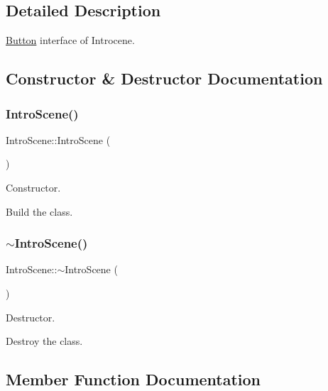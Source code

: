 \subsection{Detailed Description}
\hyperlink{classButton}{Button} interface of Introcene. 

\subsection{Constructor \& Destructor Documentation}
\mbox{\label{classIntroScene_a3691b51409f65b40f0c84008e49ef32b}} 
\subsubsection{\texorpdfstring{Intro\+Scene()}{IntroScene()}}
{\footnotesize\ttfamily Intro\+Scene\+::\+Intro\+Scene (\begin{DoxyParamCaption}{ }\end{DoxyParamCaption})}



Constructor. 

Build the class. \mbox{\label{classIntroScene_a7cdb50b55c0f5cf66b7bd151e4abe2b1}} 
\subsubsection{\texorpdfstring{$\sim$\+Intro\+Scene()}{~IntroScene()}}
{\footnotesize\ttfamily Intro\+Scene\+::$\sim$\+Intro\+Scene (\begin{DoxyParamCaption}{ }\end{DoxyParamCaption})}



Destructor. 

Destroy the class. 

\subsection{Member Function Documentation}
\mbox{\label{classIntroScene_acabf925dab7b2a346edd398445cd5800}} 
